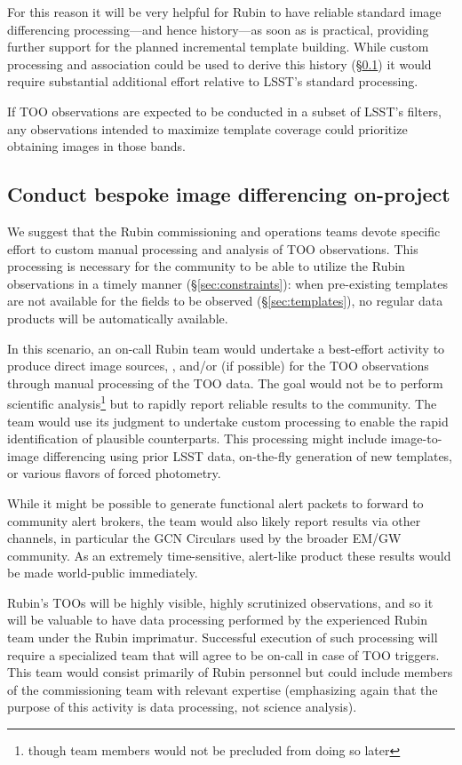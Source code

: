 \documentclass[DM,authoryear,toc]{lsstdoc}
\begin{document}
For this reason it will be very helpful for Rubin to have reliable standard image differencing processing---and hence history---as soon as is practical, providing further support for the planned incremental template building.
While custom processing and association could be used to derive this history (\S \ref{sec:processing}) it would require substantial additional effort relative to LSST's standard processing.

If TOO observations are expected to be conducted in a subset of LSST's filters, any observations intended to maximize template coverage could prioritize obtaining images in those bands.

\subsection{Conduct bespoke image differencing on-project} \label{sec:processing}

We suggest that the Rubin commissioning and operations teams devote specific effort to custom manual processing and analysis of TOO observations.
This processing is necessary for the community to be able to utilize the Rubin observations in a timely manner (\S \ref{sec:constraints}): when pre-existing templates are not available for the fields to be observed (\S \ref{sec:templates}), no regular data products will be automatically available.

In this scenario, an on-call Rubin team would undertake a best-effort activity to produce direct image sources, \DIASources, and/or \DIAObjects (if possible) for the TOO observations through manual processing of the TOO data.
The goal would not be to perform scientific analysis\footnote{though team members would not be precluded from doing so later} but to rapidly report reliable results to the community.
The team would use its judgment to undertake custom processing to enable the rapid identification of plausible counterparts.
This processing might include image-to-image differencing using prior LSST data, on-the-fly generation of new templates, or various flavors of forced photometry.

While it might be possible to generate functional alert packets to forward to community alert brokers, the team would also likely report results via other channels, in particular the GCN Circulars used by the broader EM/GW community.
As an extremely time-sensitive, alert-like product these results would be made world-public immediately.

Rubin's TOOs will be highly visible, highly scrutinized observations, and so it will be valuable to have data processing performed by the experienced Rubin team under the Rubin imprimatur.
Successful execution of such processing will require a specialized team that will agree to be on-call in case of TOO triggers.
This team would consist primarily of Rubin personnel but could include members of the commissioning team with relevant expertise (emphasizing again that the purpose of this activity is data processing, not science analysis).
\end{document}

